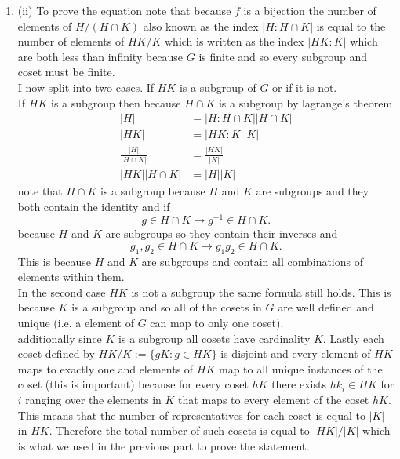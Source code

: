 \documentclass{article}
\begin{document}
\begin{enumerate}
        \item (ii)
            To prove the equation note that because $f$ is a bijection the number
            of elements of  $H / (H \cap K)$ also known as the index  $|H : H \cap K|$ is
            equal to the number of elements of $HK / K$ which is written as the index $|HK : K|$ which are both
            less than infinity because $G$ is finite and so every subgroup and coset must be finite.
            \\
            I now split into two cases. If $HK$ is a subgroup of $G$ or if it is not.
            \\
            If $HK$ is a subgroup then because $H \cap K$ is a subgroup 
            by lagrange's theorem
            \begin{align*}
                |H| &= |H : H \cap K| |H \cap K|\\
                |HK| &= |HK : K| |K|\\
                \frac{|H|}{|H \cap K|} &= \frac{|HK|}{|K|}\\
                |HK||H \cap K| &= |H||K|
            \end{align*}
            note that $H \cap K$ is a subgroup because $H$ and $K$ are subgroups and they both contain the identity and if 
            \[
            g \in H \cap K \rightarrow g^{-1} \in H \cap K
            .\] 
            because $H$ and $K$ are subgroups so they contain their inverses and 
            \[
            g_1,g_2 \in H \cap K \rightarrow g_1g_2 \in H \cap K
            .\] This is because $H$ and $K$ are subgroups and contain all combinations of elements within them.
            \\
            In the second case $HK$ is not a subgroup the same formula still holds. This is because $K$ is a subgroup and so
            all of the cosets in $G$ are well defined and unique (i.e. a element of $G$ can map to only one coset).\\
            additionally since $K$ is a subgroup all cosets have cardinality $K$. Lastly each coset defined by $HK/K := \{gK : g \in HK\}$  is disjoint and every element of $HK$ maps to exactly one and
            elements of $HK$ map to all unique instances of the coset (this is important) because for every coset $hK$ there exists $hk_i \in HK$ for $i$ ranging over the elements in $K$ that maps to every element of the coset  $hK$.
            This means that the number of representatives for each coset is equal to $|K|$ in $HK$.
            Therefore the total number of such cosets is equal to $|HK|/|K|$ which is what we used in the previous part to prove the statement.
    \end{enumerate}
\end{document}
